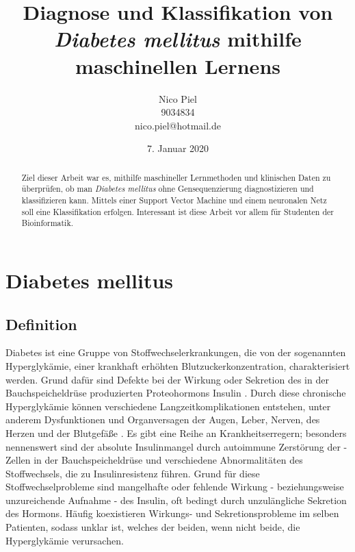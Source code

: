 \documentclass[11.5pt]{article}
\title{Diagnose und Klassifikation von \textit{Diabetes mellitus} mithilfe maschinellen Lernens}
\author{Nico Piel \\ 9034834 \\ nico.piel@hotmail.de}
\date{7. Januar 2020}
\begin{document}
\maketitle

\newpage

\tableofcontents

\newpage

\begin{abstract}

Ziel dieser Arbeit war es, mithilfe maschineller Lernmethoden und klinischen Daten zu überprüfen, ob man \textit{Diabetes mellitus} ohne Gensequenzierung diagnostizieren und klassifizieren kann. 
Mittels einer Support Vector Machine und einem neuronalen Netz soll eine Klassifikation erfolgen.
Interessant ist diese Arbeit vor allem für Studenten der Bioinformatik.

\end{abstract}

\newpage

\section{Diabetes mellitus}


\subsection{Definition}


Diabetes ist eine Gruppe von Stoffwechselerkrankungen, die von der sogenannten Hyperglykämie, einer krankhaft erhöhten Blutzuckerkonzentration, charakterisiert werden. Grund dafür sind Defekte bei der Wirkung oder Sekretion des in der Bauchspeicheldrüse produzierten Proteohormons Insulin \cite[p.~62]{ada}. Durch diese chronische Hyperglykämie können verschiedene Langzeitkomplikationen entstehen, unter anderem Dysfunktionen und Organversagen der Augen, Leber, Nerven, des Herzen und der Blutgefäße \cite[p.~540]{who}.
Es gibt eine Reihe an Krankheitserregern; besonders nennenswert sind der absolute Insulinmangel durch autoimmune Zerstörung der \textbeta-Zellen in der Bauchspeicheldrüse und verschiedene Abnormalitäten des Stoffwechsels, die zu Insulinresistenz führen. Grund für diese Stoffwechselprobleme sind mangelhafte oder fehlende Wirkung - beziehungsweise unzureichende Aufnahme - des Insulin, oft bedingt durch unzulängliche Sekretion des Hormons. Häufig koexistieren Wirkungs- und Sekretionsprobleme im selben Patienten, sodass unklar ist, welches der beiden, wenn nicht beide, die Hyperglykämie verursachen.
\end{document}
